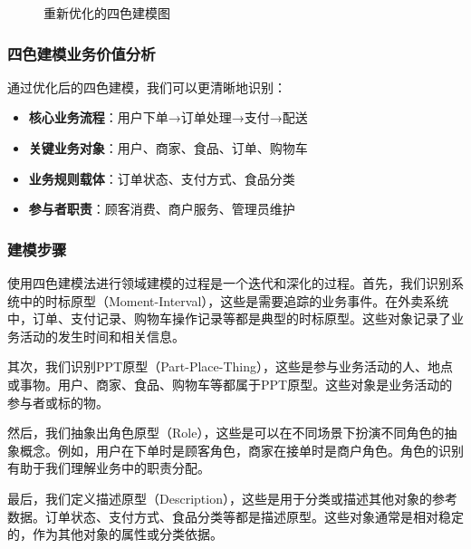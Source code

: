 \documentclass[a4paper,12pt]{article}
\begin{document}
\begin{figure}[H]
\caption{重新优化的四色建模图}
\label{fig:redesigned-four-color}
\end{figure}

\subsubsection{四色建模业务价值分析}

通过优化后的四色建模，我们可以更清晰地识别：

\begin{itemize}
\item \textbf{核心业务流程}：用户下单→订单处理→支付→配送
\item \textbf{关键业务对象}：用户、商家、食品、订单、购物车
\item \textbf{业务规则载体}：订单状态、支付方式、食品分类
\item \textbf{参与者职责}：顾客消费、商户服务、管理员维护
\end{itemize}

\subsubsection{建模步骤}

使用四色建模法进行领域建模的过程是一个迭代和深化的过程。首先，我们识别系统中的时标原型（Moment-Interval），这些是需要追踪的业务事件。在外卖系统中，订单、支付记录、购物车操作记录等都是典型的时标原型。这些对象记录了业务活动的发生时间和相关信息。

其次，我们识别PPT原型（Part-Place-Thing），这些是参与业务活动的人、地点或事物。用户、商家、食品、购物车等都属于PPT原型。这些对象是业务活动的参与者或标的物。

然后，我们抽象出角色原型（Role），这些是可以在不同场景下扮演不同角色的抽象概念。例如，用户在下单时是顾客角色，商家在接单时是商户角色。角色的识别有助于我们理解业务中的职责分配。

最后，我们定义描述原型（Description），这些是用于分类或描述其他对象的参考数据。订单状态、支付方式、食品分类等都是描述原型。这些对象通常是相对稳定的，作为其他对象的属性或分类依据。
\end{document}
